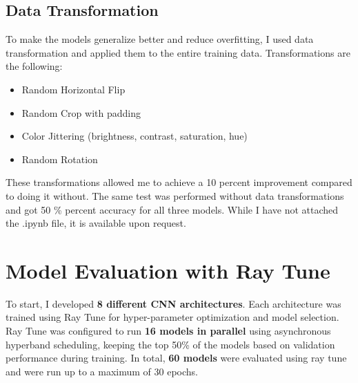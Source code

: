 \documentclass[conference]{IEEEtran}
\begin{document}
\subsection{Data Transformation}
To make the models generalize better and reduce overfitting, I used data transformation and applied them to the entire training data. Transformations are the following:
\begin{itemize}
    \item Random Horizontal Flip
    \item Random Crop with padding
    \item Color Jittering (brightness, contrast, saturation, hue)
    \item Random Rotation
\end{itemize}
These transformations allowed me to achieve a 10 percent improvement compared to doing it without.
The same test was performed without data transformations and got 50 \% percent accuracy for all three models. While I have not attached the .ipynb file, it is available upon request.

\section{Model Evaluation with Ray Tune} \label{sec: models evaluation}
To start, I developed \textbf{8 different CNN architectures}.
Each architecture was trained using Ray Tune for hyper-parameter optimization and model selection.
Ray Tune was configured to run \textbf{16 models in parallel} using asynchronous hyperband scheduling, keeping the top 50\% of the models based on validation performance during training.
In total, \textbf{60 models} were evaluated using ray tune and were run up to a maximum of 30 epochs.


\end{document}
